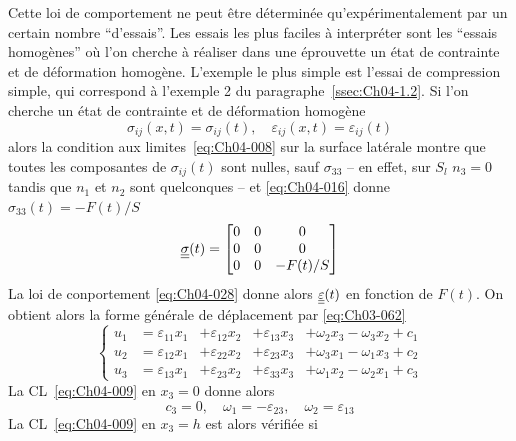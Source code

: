 Cette loi de comportement ne peut être déterminée qu'expérimentalement par un certain nombre ``d'essais''.
Les essais les plus faciles à interpréter sont les ``essais homogènes'' où l'on cherche à réaliser dans une éprouvette un état de contrainte et de déformation homogène.
L'exemple le plus simple est l'essai de compression simple, qui correspond à l'exemple 2 du paragraphe~\ref{ssec:Ch04-1.2}.
Si l'on cherche un état de contrainte et de déformation homogène
\begin{equation}
    \sigma_{ij} (x,t) = \sigma_{ij}(t), \quad \varepsilon_{ij}(x,t) = \varepsilon_{ij}(t)
    \label{eq:Ch04-029}
\end{equation}
alors la condition aux limites~\eqref{eq:Ch04-008} sur la surface latérale montre que toutes les composantes de $\sigma_{ij}(t)$ sont nulles, sauf $\sigma_{33}$ -- en effet, sur $S_l$ $n_3=0$ tandis que $n_1$ et $n_2$ sont quelconques -- et \eqref{eq:Ch04-016} donne $\sigma_{33}(t)=-F(t)/S$
\begin{equation}
    \underline{\underline{\sigma}}(t) = \begin{bmatrix}
        0 & 0 & 0 \\
        0 & 0 & 0 \\
        0 & 0 & -F(t)/S
    \end{bmatrix}
    \label{eq:Ch04-030}
\end{equation}
La loi de conportement \eqref{eq:Ch04-028} donne alors $\underline{\underline{\varepsilon}}(t)$ en fonction de $F(t)$.
On obtient alors la forme générale de déplacement par \eqref{eq:Ch03-062}
\begin{equation}
    \left\{
    \begin{aligned}
        u_1 &= \varepsilon_{11} x_1 &+ \varepsilon_{12}x_2 &+ \varepsilon_{13}x_3 &+ \omega_{2}x_3 - \omega_{3} x_2 +c_1\\
        u_2 &= \varepsilon_{12} x_1 &+ \varepsilon_{22}x_2 &+ \varepsilon_{23}x_3 &+ \omega_{3}x_1 - \omega_{1} x_3 +c_2\\
        u_3 &= \varepsilon_{13} x_1 &+ \varepsilon_{23}x_2 &+ \varepsilon_{33}x_3 &+ \omega_{1}x_2 - \omega_{2} x_1 +c_3
    \end{aligned}
    \right.
    \label{eq:Ch04-031}
\end{equation}
La CL~\eqref{eq:Ch04-009} en $x_3 =0$ donne alors
\begin{equation*}
    c_3 = 0, \quad \omega_1 = -\varepsilon_{23}, \quad \omega_2 = \varepsilon_{13}
\end{equation*}
La CL~\eqref{eq:Ch04-009}  en $x_3=h$ est alors vérifiée si
